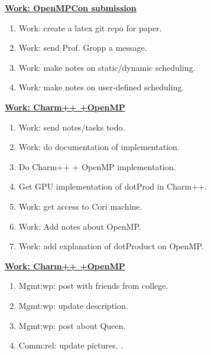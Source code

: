 \begin{multicols}{4}
\begin{minipage}{\columnwidth}
\underline{\bf \tiny {Work: OpenMPCon submission}}
\begin{enumerate}
\tiny \item \tiny Work: create a latex git repo for paper.
\item \tiny Work: send Prof. Gropp a message.
\item \tiny Work: make notes on static/dynamic scheduling.
\item \tiny Work: make notes on user-defined scheduling.
\end{enumerate}
\end{minipage}

\begin{minipage}{\columnwidth}
\underline{\bf \tiny {Work: Charm++ +OpenMP}}
\begin{enumerate}
\tiny \item \tiny Work: send notes/tasks todo.
\item \tiny Work: do documentation of implementation.
\item \tiny Do Charm++ + OpenMP implementation.
\item \tiny Get GPU implementation of dotProd in Charm++.
\item \tiny Work: get access to Cori machine.
\item \tiny Work: Add notes about OpenMP.
\item \tiny Work: add explanation of dotProduct on OpenMP.
\end{enumerate}
\end{minipage}

\begin{minipage}{\columnwidth} 
\underline{\bf \tiny {Work: Charm++ +OpenMP}}
\begin{enumerate}
\item \tiny Mgmt:wp: post with friends from college. 
\item \tiny Mgmt:wp: update description.
\item \tiny Mgmt:wp: post about Queen.
\item \tiny Comm:rel: update pictures. .
\end{enumerate}
\end{minipage}


\end{multicols}
